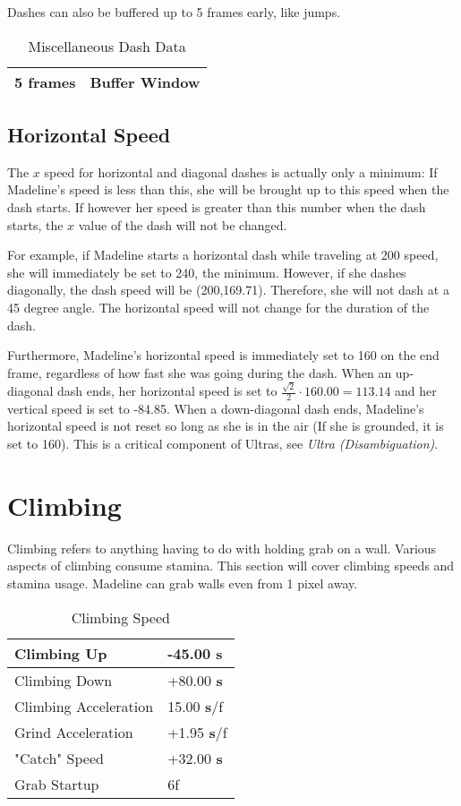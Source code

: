 \documentclass[oneside]{book}
\newcommand{\s}{\textbf{s}}
\begin{document}
Dashes can also be buffered up to 5 frames early, like jumps.

\begin{table}[h]
\begin{tabular}{|l|l|}
\hline
5 frames&Buffer Window\\
\hline
\end{tabular}
\caption{Miscellaneous Dash Data}
\end{table}

\subsection{Horizontal Speed}

The $x$ speed for horizontal and diagonal dashes is actually only a minimum: If Madeline's speed is less than this, she will be brought up to this speed when the dash starts. If however her speed is greater than this number when the dash starts, the $x$ value of the dash will not be changed.

For example, if Madeline starts a horizontal dash while traveling at 200 speed, she will immediately be set to 240, the minimum. However, if she dashes diagonally, the dash speed will be (200,169.71). Therefore, she will not dash at a 45 degree angle. The horizontal speed will not change for the duration of the dash.

Furthermore, Madeline's horizontal speed is immediately set to 160 on the end frame, regardless of how fast she was going during the dash. When an up-diagonal dash ends, her horizontal speed is set to $\frac{\sqrt{2}}{2}\cdot 160.00=113.14$ and her vertical speed is set to -84.85. When a down-diagonal dash ends, Madeline's horizontal speed is not reset so long as she is in the air (If she is grounded, it is set to 160). This is a critical component of Ultras, see \textit{Ultra (Disambiguation)}.

\section{Climbing}

Climbing refers to anything having to do with holding grab on a wall. Various aspects of climbing consume stamina. This section will cover climbing speeds and stamina usage. Madeline can grab walls even from 1 pixel away.

\begin{table}[h]
\begin{tabular}{|l|l|}
\hline
Climbing Up&-45.00 \s\\
\hline
Climbing Down&+80.00 \s\\
\hline
Climbing Acceleration&15.00 \s/f\\
\hline
Grind Acceleration&+1.95 \s/f\\
\hline
"Catch" Speed&+32.00 \s\\
\hline
Grab Startup& 6f\\
\hline
\end{tabular}
\caption{Climbing Speed}
\end{table}
\end{document}
